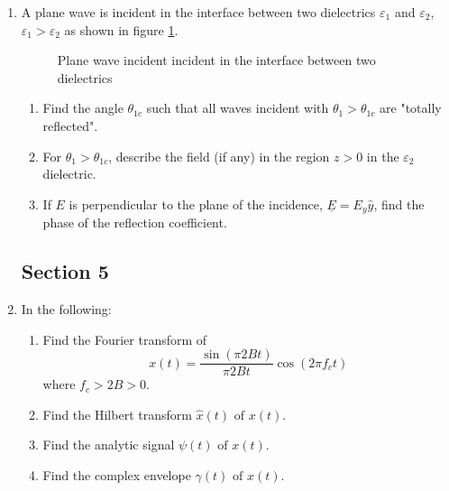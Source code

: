 \documentclass[main.tex]{subfiles}
\begin{document}
\begin{enumerate}
\item A plane wave is incident in the interface between two dielectrics $\varepsilon_1$ and $\varepsilon_2$, $\varepsilon_1 > \varepsilon_2$ as shown in figure \ref{fig:12q_a}.

\begin{figure}
\centering{}
\caption{Plane wave incident incident in the interface between two dielectrics}
\label{fig:12q_a}
\end{figure}

    \begin{enumerate}
        \item Find the angle $\theta_{1c}$ such that all waves incident with $\theta_1 > \theta_{1c}$ are "totally reflected".
        \item For $\theta_1 > \theta_{1c}$, describe the field (if any) in the region $z > 0$ in the $\varepsilon_2$ dielectric.
        \item If \underline{$E$} is perpendicular to the plane of the incidence, $\underline{E} = E_y \hat{y}$, find the phase of the reflection coefficient.
    \end{enumerate}

\subsection{Section 5} 

\item In the following:

    \begin{enumerate}
        \item Find the Fourier transform of 
        $$x(t)=\frac{\sin (\pi 2 B t)}{\pi 2 B t} \cos \left(2 \pi f_{c} t\right)$$
        where $f_{c}>2 B>0$.
        \item Find the Hilbert transform $\hat{x}(t) \text { of } x(t)$.
        \item Find the analytic signal $\psi(t) \text { of } x(t)$.
        \item Find the complex envelope $\gamma(t) \text { of } x(t)$.
    \end{enumerate}
    

\end{enumerate}
\end{document}
